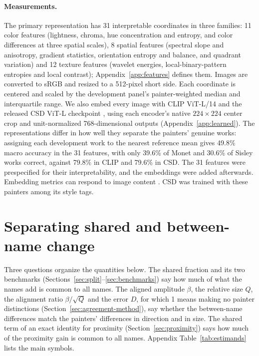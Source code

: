 \documentclass[10pt]{article}
\begin{document}
\paragraph{Measurements.}
The primary representation has 31 interpretable coordinates in three families: 11 color features
(lightness, chroma, hue concentration and entropy, and color differences at three spatial
scales), 8 spatial features (spectral slope and anisotropy, gradient statistics, orientation
entropy and balance, and quadrant variation) and 12 texture features (wavelet energies,
local-binary-pattern entropies and local contrast); Appendix~\ref{app:features} defines them.
Images are converted to sRGB and resized to a 512-pixel short side. Each coordinate is centered
and scaled by the development panel's painter-weighted median and interquartile range. We also
embed every image with CLIP ViT-L/14 \citep{radford2021} and the released CSD ViT-L checkpoint
\citep{somepalli2024style}, using each encoder's native $224\times224$ center crop and
unit-normalized 768-dimensional outputs (Appendix~\ref{app:learned}). The representations differ
in how well they separate the painters' genuine works: assigning each development work to the
nearest reference mean gives 49.8\% macro accuracy in the 31 features, with only 39.6\% of Monet
and 30.6\% of Sisley works correct, against 79.8\% in CLIP and 79.6\% in CSD. The 31 features
were prespecified for their interpretability, and the embeddings were added afterwards. Embedding
metrics can respond to image content \citep{kynkaanniemi2023role}. CSD was trained with these
painters among its style tags.

\section{Separating shared and between-name change}\label{sec:method}

Three questions organize the quantities below. The shared fraction and its two benchmarks
(Sections~\ref{sec:split}--\ref{sec:benchmarks}) say how much of what the names add is common to
all names. The aligned amplitude $\beta$, the relative size $Q$, the alignment ratio
$\beta/\sqrt{Q}$ and the error $D$, for which 1 means making no painter distinctions
(Section~\ref{sec:agreement-method}), say whether the between-name differences match the painters'
differences in direction and in size. The shared term of an exact identity for proximity
(Section~\ref{sec:proximity}) says how much of the proximity gain is common to all names. Appendix
Table~\ref{tab:estimands} lists the main symbols.
\end{document}
